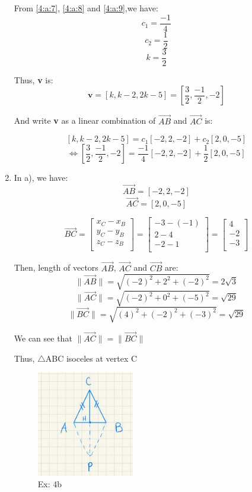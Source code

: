 \documentclass{article}
\begin{document}
\begin{enumerate}[label=({\alph*})]
            From \eqref{4:a:7}, \eqref{4:a:8} and \eqref{4:a:9},we have:
            \[c_{1} = \frac{-1}{4}\]
            \[c_{2} = \frac{1}{2}\]
            \[k = \frac{3}{2}\]

            Thus, \textbf{v} is:
            \[\textbf{v} = [k,k-2,2k-5] = [\frac{3}{2},\frac{-1}{2},-2]\]

            And write \textbf{v} as a linear combination of \(\overrightarrow{AB}\) and \(\overrightarrow{AC}\) is:

            \[[k,k - 2,2k - 5] = c_{1}[-2,2,-2] + c_{2}[2,0,-5]\]
            \[\Leftrightarrow [\frac{3}{2},\frac{-1}{2},-2] = \frac{-1}{4}[-2,2,-2] + \frac{1}{2}[2,0,-5]\]
            \item
            In a), we have:
            \[\overrightarrow{AB} = [-2, 2, -2]\]
            \[\overrightarrow{AC} = [2,0,-5]\]

            \[\overrightarrow{BC} = \begin{bmatrix}x_{C} - x_{B}\\y_{C} - y_{B}\\z_{C} - z_{B}\\\end{bmatrix} = \begin{bmatrix}-3 - (-1)\\2 - 4\\-2 - 1\\\end{bmatrix} = \begin{bmatrix}4\\-2\\-3\\\end{bmatrix}\]

            Then, length of vectors \(\overrightarrow{AB}\), \(\overrightarrow{AC}\) and \(\overrightarrow{CB}\) are:
            \[\|\overrightarrow{AB}\| = \sqrt{(-2)^2 + 2^2 + (-2)^2} = 2\sqrt{3}\]
            \[\|\overrightarrow{AC}\| = \sqrt{(-2)^2 + 0^2 + (-5)^2} = \sqrt{29}\]
            \[\|\overrightarrow{BC}\| = \sqrt{(4)^2 + (-2)^2 + (-3)^2} = \sqrt{29}\]

            We can see that \(\|\overrightarrow{AC}\| = \|\overrightarrow{BC}\|\)
            
            Thus, \(\triangle\)ABC isoceles at vertex C 

            \begin{figure}[ht]
                \centering
                     \includegraphics[width=0.4\textwidth]{ex4.jpg} 
                     \caption{Ex: 4b}
                     \label{Ex:4b}
            \end{figure}



\end{enumerate}
\end{document}
